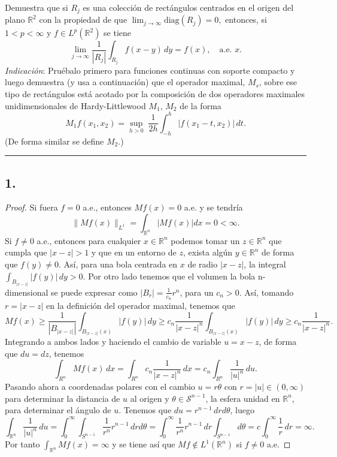 \documentclass[11pt,a4paper]{article}
\begin{document}
    Demuestra que si $R_j$ es una colección de rectángulos centrados en el origen del plano $\mathbb R^2$ con la propiedad de que $\displaystyle \lim_{j\to\infty} \mbox{diag}(R_j)= 0,$ entonces, si $1<p<\infty$ y $f\in L^p(\mathbb R^2)$ se tiene
 $$
 \lim_{j\to\infty}\frac 1{|R_j|}\int_{R_j} f(x-y)\, dy = f(x), \quad \mbox{a.e. }  x.
 $$
 {\it Indicación}: Pruébalo primero para funciones continuas con soporte compacto y luego demuestra (y usa a continuación) que el operador maximal, $M_s$, sobre ese tipo de rectángulos está acotado por la composición de dos operadores maximales unidimensionales de Hardy-Littlewood $M_1, \, M_2$ de la forma
 $$
 M_1f(x_1,x_2)=\sup_{h>0}\; \frac1{2h}\int_{-h}^{h}|f(x_1-t,x_2)|\, dt.
 $$
 (De forma similar se define $M_2$.)
   
\vskip 6mm
\hrule
\vskip 5mm

\newpage
{} 

\subsection*{1.}
\begin{proof}
  Si fuera $ f = 0 $ a.e., entonces $ Mf(x) = 0 $ a.e. y se tendría
  $$
    \| Mf(x) \|_{L^1} = \int_{\mathbb R^n} |Mf(x)| dx = 0 < \infty.
  $$
  Si $ f \neq 0 $ a.e., entonces para cualquier $ x \in \mathbb R^n $ podemos tomar un $ z \in \mathbb R^n $ que cumpla que $ |x-z| > 1$ y que en un entorno de $ z $, exista algún $ y \in \mathbb R^n $ de forma que $ f(y) \neq 0 $. Así, para una bola centrada en $ x $ de radio $ |x-z| $, la integral 
  $
    \int_{B_{|x-z|}} |f(y)|\, dy > 0.
  $
  Por otro lado tenemos que el volumen la bola n-dimensional se puede expresar como
  $ |B_r| = \frac{1}{c_n} r^n $, para un $c_n > 0 $. Así, tomando $ r = |x-z| $ en la definición del operador maximal, tenemos que
  $$
    Mf(x) \geq \frac{1}{|B_{|x-z|}|} \int_{B_{|x-z|}(x)} |f(y)|\, dy \geq c_n \frac{1}{|x-z|^n} \int_{B_{|x-z|}(x)} |f(y)|\, dy \geq c_n \frac{1}{|x-z|^n}.
  $$
  Integrando a ambos lados y haciendo el cambio de variable $ u = x - z $, de forma que $ du = dz $, tenemos
  $$
    \int_{R^n} Mf(x) \, dx = \int_{R^n} c_n \frac{1}{|x-z|^n} \, dx = c_n \int_{R^n} \frac{1}{|u|^n} \, du.
  $$
  Pasando ahora a coordenadas polares con el cambio $ u = r\theta $ con $ r = |u| \in (0, \infty)$ para determinar la distancia de $ u $ al origen y $ \theta \in \mathcal S^{n-1} $, la esfera unidad en $ \mathbb R^n $, para determinar el ángulo de $ u $. Tenemos que $ du = r^{n-1} \, dr d\theta $, luego
  $$
    \int_{\mathbb R^n} \frac{1}{|u|^n} \, du = \int_{0}^\infty \int_{S^{n-1}} \frac{1}{r^n} r^{n-1} \, dr d\theta = \int_{0}^\infty \frac{1}{r^n} r^{n-1} \, dr \int_{S^{n-1}} d\theta = c \int_{0}^\infty \frac{1}{r} \, dr = \infty.
  $$
  Por tanto $ \int_{\mathbb R^n} Mf(x) = \infty $ y se tiene así que $ Mf \notin L^1(\mathbb R^n)$ si $f \neq 0$ a.e.
\end{proof}
\end{document}
